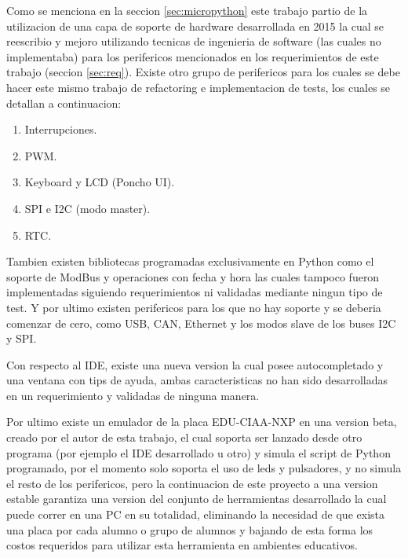 Como se menciona en la seccion \ref{sec:micropython} este trabajo partio de la utilizacion de una capa de soporte de hardware desarrollada en 2015 la cual se reescribio y mejoro utilizando tecnicas de ingenieria de software (las cuales no implementaba) para los perifericos mencionados en los requerimientos de este trabajo (seccion \ref{sec:req}). Existe otro grupo de perifericos para los cuales se debe hacer este mismo trabajo de refactoring e implementacion de tests, los cuales se detallan a continuacion:

\begin{enumerate}
	\item  Interrupciones.
	\item  PWM.
	\item  Keyboard y LCD (Poncho UI). 
	\item  SPI e I2C (modo master).
	\item  RTC.
\end{enumerate}

Tambien existen bibliotecas programadas exclusivamente en Python como el soporte de ModBus y operaciones con fecha y hora las cuales tampoco fueron implementadas siguiendo requerimientos ni validadas mediante ningun tipo de test. Y por ultimo existen perifericos para los que no hay soporte y se deberia comenzar de cero, como USB, CAN, Ethernet y los modos slave de los buses I2C y SPI.

Con respecto al IDE, existe una nueva version la cual posee autocompletado y una ventana con tips de ayuda, ambas caracteristicas no han sido desarrolladas en un requerimiento y validadas de ninguna manera.

Por ultimo existe un emulador de la placa EDU-CIAA-NXP en una version beta, creado por el autor de esta trabajo, el cual soporta ser lanzado desde otro programa (por ejemplo el IDE desarrollado u otro) y simula el script de Python programado, por el momento solo soporta el uso de leds y pulsadores, y no simula el resto de los perifericos, pero la continuacion de este proyecto a una version estable garantiza una version del conjunto de herramientas desarrollado la cual puede correr en una PC en su totalidad, eliminando la necesidad de que exista una placa por cada alumno o grupo de alumnos y bajando de esta forma los costos requeridos para utilizar esta herramienta en ambientes educativos.



